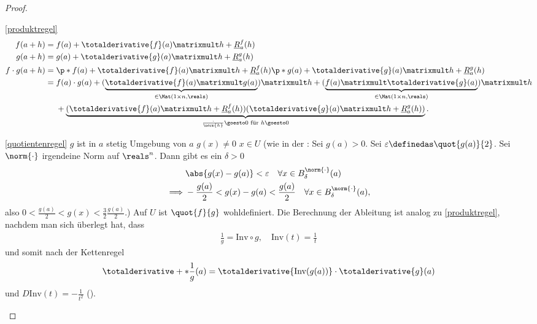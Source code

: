 \begin{proof}
    \begin{proofdescription}
        \item[\ref{produktregel}]
        \begin{align*}
            f(a+h)&=f(a)+\totalderivative{f}(a)\matrixmult h+\underline{R}_{a}^f(h)\\
            g(a+h)&=g(a)+\totalderivative{g}(a)\matrixmult h+\underline{R}_{a}^g(h)\\
            f\cdot g(a+h)&\begin{aligned}[t]
                &=\p*{ f(a)+\totalderivative{f}(a)\matrixmult h+\underline{R}_{a}^f(h) }\p*{ g(a)+\totalderivative{g}(a)\matrixmult h+\underline{R}_{a}^g(h) }\\
                &=\begin{aligned}[t]
                    &f(a)\cdot g(a)+(\underbrace{\totalderivative{f}(a)\matrixmult g(a)}_{\in \Mat(1\times n,\reals)})\matrixmult h+(\underbrace{f(a)\matrixmult \totalderivative{g}(a)}_{\in \Mat(1\times n,\reals)})\matrixmult h\\
                    &+\underbrace{(\totalderivative{f}(a)\matrixmult h+\underline{R}_a^f(h))(\totalderivative{g}(a)\matrixmult h+\underline{R}_a^g(h))}_{\frac{\cdot}{\norm{h}}\goesto 0 \text{ für }h\goesto 0}.
                \end{aligned}
            \end{aligned}            
        \end{align*}
        \item[\ref{quotientenregel}] \( g \) ist in \( a \) stetig \timplies \texists Umgebung von \( a \) \sd \( g(x)\neq 0 \) \tforall \( x\in U \) (wie in der : Sei \obda \( g(a)>0 \). Sei \( \varepsilon\definedas \quot{g(a)}{2} \). Sei \( \norm{\cdot} \) irgendeine Norm auf \( \reals^n \). Dann gibt es ein \( \delta>0 \) \sd
        \begin{align*}
            &\abs{g(x)-g(a)}<\varepsilon\quad \forall x\in B_{\delta}^{\norm{\cdot}}(a)\\
            \implies &-\frac{g(a)}{2}<g(x)-g(a)<\frac{g(a)}{2}\quad \forall x\in B_{\delta}^{\norm{\cdot}}(a),
        \end{align*}
        also \( 0<\frac{g(a)}{2}<g(x)<\frac{3}{2}\frac{g(a)}{2} \).) \timplies Auf \( U \) ist \( \quot{f}{g} \) wohldefiniert. Die Berechnung der Ableitung ist analog zu \ref{produktregel}, nachdem man sich überlegt hat, dass
        \begin{align*}
            \frac{1}{g}=\text{Inv}\circ g,\quad \text{Inv}(t)=\frac{1}{t}
        \end{align*}
        und somit nach der Kettenregel
        \begin{align*}
            \totalderivative+*{\frac{1}{g}}(a)=\totalderivative{\text{Inv}(g(a))}\cdot \totalderivative{g}(a)
        \end{align*}
        und \( D \text{Inv}(t)=-\frac{1}{t^2} \) ().
    \end{proofdescription}    
\end{proof}

